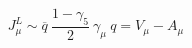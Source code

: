 \begin{equation}
J_\mu^L\sim \overline{q}~\frac{1-\gamma_5}{2}~\gamma_\mu~q=V_\mu-A_\mu
\end{equation}

